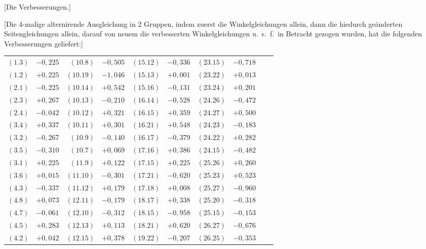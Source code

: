 \documentclass[12pt,a4paper]{article}
\theoremstyle{plain}
\theoremstyle{definition}
\theoremstyle{remark}
\begin{document}
[Die Verbesserungen.]

[Die 4-malige alternirende Ausgleichung in 2 Gruppen, indem zuerst die Winkelgleichungen allein, dann die hiedurch ge\"anderten Seitengleichungen allein, darauf von neuem die verbesserten Winkelgleichungen u.\ s.\ f.\ in Betracht gezogen wurden, hat die folgenden Verbesserungen geliefert:]

\begin{center}
\begin{tabular}{r@{${}= {}$}lr@{${}= {}$}lr@{${}= {}$}lr@{${}= {}$}lr@{${}= {}$}l}
$(1.3)$ & $-0{,}225$ & $(10.8)$ & $-0{,}505$ & $(15.12)$ & $-0{,}336$ & $(23.15)$ & $-0{,}718$\\
$(1.2)$ & $+0{,}225$ & $(10.19)$ & $-1{,}046$ & $(15.13)$ & $+0{,}001$ & $(23.22)$ & $+0{,}013$\\
$(2.1)$ & $-0{,}225$ & $(10.14)$ & $+0{,}542$ & $(15.16)$ & $-0{,}131$ & $(23.24)$ & $+0{,}201$\\
$(2.3)$ & $+0{,}267$ & $(10.13)$ & $-0{,}210$ & $(16.14)$ & $-0{,}528$ & $(24.26)$ & $-0{,}472$\\
$(2.4)$ & $-0{,}042$ & $(10.12)$ & $+0{,}321$ & $(16.15)$ & $+0{,}359$ & $(24.27)$ & $+0{,}500$\\
$(3.4)$ & $+0{,}337$ & $(10.11)$ & $+0{,}301$ & $(16.21)$ & $+0{,}548$ & $(24.23)$ & $-0{,}183$\\
$(3.2)$ & $-0{,}267$ & $(10.9)$ & $-0{,}140$ & $(16.17)$ & $-0{,}379$ & $(24.22)$ & $+0{,}282$\\
$(3.5)$ & $-0{,}310$ & $(10.7)$ & $+0{,}069$ & $(17.16)$ & $+0{,}386$ & $(24.15)$ & $-0{,}482$\\
$(3.1)$ & $+0{,}225$ & $(11.9)$ & $+0{,}122$ & $(17.15)$ & $+0{,}225$ & $(25.26)$ & $+0{,}260$\\
$(3.6)$ & $+0{,}015$ & $(11.10)$ & $-0{,}301$ & $(17.21)$ & $-0{,}620$ & $(25.23)$ & $+0{,}523$\\
$(4.3)$ & $-0{,}337$ & $(11.12)$ & $+0{,}179$ & $(17.18)$ & $+0{,}008$ & $(25.27)$ & $-0{,}960$\\
$(4.8)$ & $+0{,}073$ & $(12.11)$ & $-0{,}179$ & $(18.17)$ & $+0{,}338$ & $(25.20)$ & $-0{,}318$\\
$(4.7)$ & $-0{,}061$ & $(12.10)$ & $-0{,}312$ & $(18.15)$ & $-0{,}958$ & $(25.15)$ & $-0{,}153$\\
$(4.5)$ & $+0{,}283$ & $(12.13)$ & $+0{,}113$ & $(18.21)$ & $+0{,}620$ & $(26.27)$ & $-0{,}676$\\
$(4.2)$ & $+0{,}042$ & $(12.15)$ & $+0{,}378$ & $(19.22)$ & $-0{,}207$ & $(26.25)$ & $-0{,}353$\\

\end{tabular}
\end{center}
\end{document}

